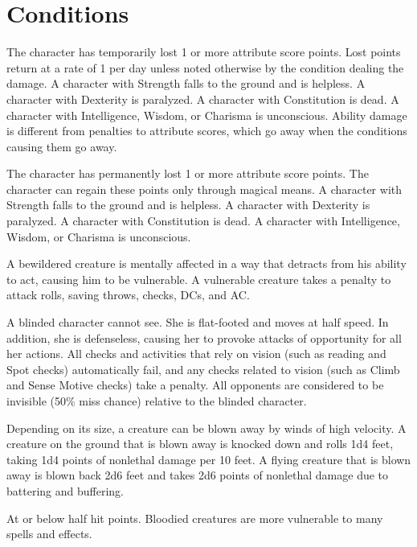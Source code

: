 \appendix
\chapter{Conditions}

 The character has temporarily lost 1 or more attribute score points. Lost points return at a rate of 1 per day unless noted otherwise by the condition dealing the damage. A character with Strength  falls to the ground and is helpless. A character with Dexterity  is paralyzed. A character with Constitution  is dead. A character with Intelligence, Wisdom, or Charisma  is unconscious. Ability damage is different from penalties to attribute scores, which go away when the conditions causing them go away.

 The character has permanently lost 1 or more attribute score points. The character can regain these points only through magical means. A character with Strength  falls to the ground and is helpless. A character with Dexterity  is paralyzed. A character with Constitution  is dead. A character with Intelligence, Wisdom, or Charisma  is unconscious.

 A bewildered creature is mentally affected in a way that detracts from his ability to act, causing him to be vulnerable. A vulnerable creature takes a  penalty to attack rolls, saving throws, checks, DCs, and AC.

 A blinded character cannot see. She is flat-footed and moves at half speed. In addition, she is defenseless, causing her to provoke attacks of opportunity for all her actions. All checks and activities that rely on vision (such as reading and Spot checks) automatically fail, and any checks related to vision (such as Climb and Sense Motive checks) take a  penalty. All opponents are considered to be invisible (50\% miss chance) relative to the blinded character.

 Depending on its size, a creature can be blown away by winds of high velocity. A creature on the ground that is blown away is knocked down and rolls 1d4  feet, taking 1d4 points of nonlethal damage per 10 feet. A flying creature that is blown away is blown back 2d6  feet and takes 2d6 points of nonlethal damage due to battering and buffering.

 At or below half hit points. Bloodied creatures are more vulnerable to many spells and effects.

